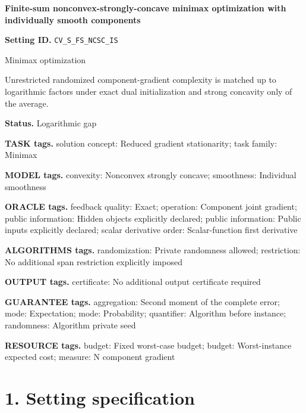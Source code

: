 \documentclass[10pt,a4paper]{article}
\begin{document}
\raggedright

{\LARGE\bfseries\sffamily\color{AtlasNavy} Finite-sum nonconvex-strongly-concave minimax optimization with individually smooth components\par}\vspace{5pt}


\textbf{Setting ID.} \texttt{CV\_\allowbreak{}S\_\allowbreak{}FS\_\allowbreak{}NCSC\_\allowbreak{}IS}



Minimax optimization



Unrestricted randomized component-gradient complexity is matched up to logarithmic factors under exact dual initialization and strong concavity only of the average.



\textbf{Status.} Logarithmic gap



\textbf{TASK tags.} solution concept: Reduced gradient stationarity; task family: Minimax



\textbf{MODEL tags.} convexity: Nonconvex strongly concave; smoothness: Individual smoothness



\textbf{ORACLE tags.} feedback quality: Exact; operation: Component joint gradient; public information: Hidden objects explicitly declared; public information: Public inputs explicitly declared; scalar derivative order: Scalar-function first derivative



\textbf{ALGORITHMS tags.} randomization: Private randomness allowed; restriction: No additional span restriction explicitly imposed



\textbf{OUTPUT tags.} certificate: No additional output certificate required



\textbf{GUARANTEE tags.} aggregation: Second moment of the complete error; mode: Expectation; mode: Probability; quantifier: Algorithm before instance; randomness: Algorithm private seed



\textbf{RESOURCE tags.} budget: Fixed worst-case budget; budget: Worst-instance expected cost; measure: N component gradient



\section{1. Setting specification}
\end{document}
